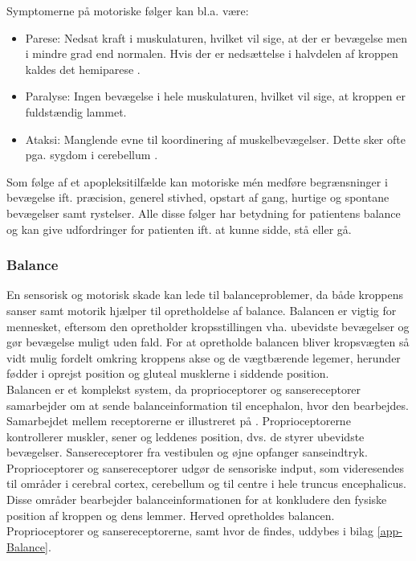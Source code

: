 \noindent Symptomerne på motoriske følger kan bl.a. være:
\begin{itemize}
  \item Parese: Nedsat kraft i muskulaturen, hvilket vil sige, at der er bevægelse men i mindre grad end normalen. Hvis der er nedsættelse i halvdelen af kroppen kaldes det hemiparese \cite{Kruuse2015a}.
  \item Paralyse: Ingen bevægelse i hele muskulaturen, hvilket vil sige, at kroppen er fuldstændig lammet. \cite{Vistrup2015}
  \item Ataksi: Manglende evne til koordinering af muskelbevægelser. Dette sker ofte pga. sygdom i cerebellum \cite{Redaktionen2015a}. 
\end{itemize}
Som følge af et apopleksitilfælde kan motoriske mén medføre begrænsninger i bevægelse ift. præcision, generel stivhed, opstart af gang, hurtige og spontane bevægelser samt rystelser. Alle disse følger har betydning for patientens balance og kan give udfordringer for patienten ift. at kunne sidde, stå eller gå. \cite{Kruuse2015a,DSfA2009}

\subsubsection{Balance}
En sensorisk og motorisk skade kan lede til balanceproblemer, da både kroppens sanser samt motorik hjælper til opretholdelse af balance. Balancen er vigtig for mennesket, eftersom den opretholder kropsstillingen vha. ubevidste bevægelser og gør bevægelse muligt uden fald. For at opretholde balancen bliver kropsvægten så vidt mulig fordelt omkring kroppens akse og de vægtbærende legemer, herunder fødder i oprejst position og gluteal musklerne i siddende position. \cite{Nichols1997} \\
Balancen er et komplekst system, da proprioceptorer og sansereceptorer samarbejder om at sende balanceinformation til encephalon, hvor den bearbejdes. Samarbejdet mellem receptorerne er illustreret på . Proprioceptorerne kontrollerer muskler, sener og leddenes position, dvs. de styrer ubevidste bevægelser. \cite{Martini2012} Sansereceptorer fra vestibulen og øjne opfanger sanseindtryk. Proprioceptorer og sansereceptorer udgør de sensoriske indput, som videresendes til områder i cerebral cortex, cerebellum og til centre i hele truncus encephalicus. Disse områder bearbejder balanceinformationen for at konkludere den fysiske position af kroppen og dens lemmer. Herved opretholdes balancen. \cite{Karnath2003,Martini2012} Proprioceptorer og sansereceptorerne, samt hvor de findes, uddybes i bilag \ref{app-Balance}.

